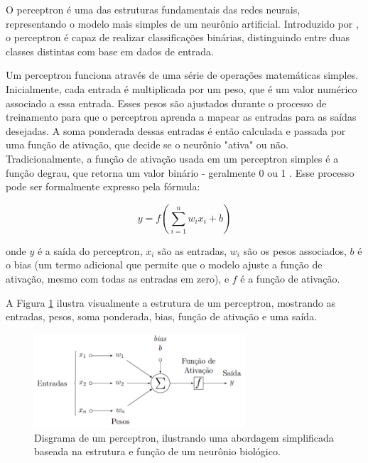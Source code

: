 
O perceptron é uma das estruturas fundamentais das redes neurais, representando o modelo mais simples de um neurônio artificial. Introduzido por , o perceptron é capaz de realizar classificações binárias, distinguindo entre duas classes distintas com base em dados de entrada.

Um perceptron funciona através de uma série de operações matemáticas simples. Inicialmente, cada entrada é multiplicada por um peso, que é um valor numérico associado a essa entrada. Esses pesos são ajustados durante o processo de treinamento para que o perceptron aprenda a mapear as entradas para as saídas desejadas. A soma ponderada dessas entradas é então calculada e passada por uma função de ativação, que decide se o neurônio "ativa" ou não. Tradicionalmente, a função de ativação usada em um perceptron simples é a função degrau, que retorna um valor binário - geralmente 0 ou 1 \cite{hertz2018introduction}. Esse processo pode ser formalmente expresso pela fórmula:

\[
y = f\left(\sum_{i=1}^{n} w_i x_i + b\right)
\]

onde $y$ é a saída do perceptron, $x_i$ são as entradas, $w_i$ são os pesos associados, $b$ é o bias (um termo adicional que permite que o modelo ajuste a função de ativação, mesmo com todas as entradas em zero), e $f$ é a função de ativação.

A Figura \ref{fig:perceptron} ilustra visualmente a estrutura de um perceptron, mostrando as entradas, pesos, soma ponderada, bias, função de ativação e uma saída.

\begin{figure}
    \centering   
    \includegraphics[width=0.7\textwidth]{fig/perceptron.png}
    \caption{Disgrama de um perceptron, ilustrando uma abordagem simplificada baseada na estrutura e função de um neurônio biológico.}
    \label{fig:perceptron}
\end{figure}

